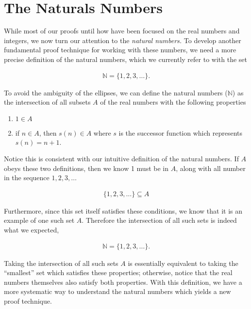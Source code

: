 \section{The Naturals Numbers}

While most of our proofs until how have been focused on the real numbers and integers, we now turn our attention to the \emph{natural numbers.} To develop another fundamental proof technique for working with these numbers, we need a more precise definition of the natural numbers, which we currently refer to with the set

\begin{align*}
	\mathbb{N} = \{ 1, 2, 3, \dots \}.
\end{align*}

To avoid the ambiguity of the ellipses, we can define the natural numbers ($\mathbb{N}$) as the intersection of all subsets $A$ of the real numbers with the following properties

\vspace{\baselineskip}
\begin{enumerate}
	\item $1 \in A$
	\item if $n \in A$, then $s(n) \in A$ where $s$ is the successor function which represents $s(n) = n + 1$.
\end{enumerate}
\vspace{\baselineskip}

Notice this is consistent with our intuitive definition of the natural numbers. If $A$ obeys these two definitions, then we know 1 must be in $A$, along with all number in the sequence $1, 2, 3, \dots$

\begin{align*}
	\{ 1, 2, 3, \dots \} \subseteq A
\end{align*}

Furthermore, since this set itself satisfies these conditions, we know that it is an example of one such set $A$. Therefore the intersection of all such sets is indeed what we expected,

\begin{align*}
	\mathbb{N} = \{ 1, 2, 3, \dots \}.
\end{align*}

Taking the intersection of all such sets $A$ is essentially equivalent to taking the ``smallest'' set which satisfies these properties; otherwise, notice that the real numbers themselves also satisfy both properties. With this definition, we have a more systematic way to understand the natural numbers which yields a new proof technique.


